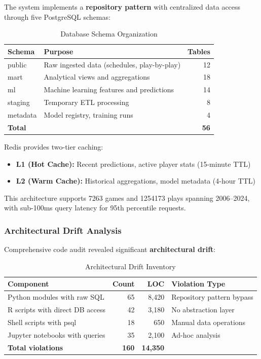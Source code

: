 The system implements a \textbf{repository pattern} with centralized data access through five PostgreSQL schemas:

\begin{table}[htbp]
\centering
\caption{Database Schema Organization}
\label{tab:schema_organization}
\begin{tabular}{@{}lp{6cm}r@{}}
\toprule
\textbf{Schema} & \textbf{Purpose} & \textbf{Tables} \\
\midrule
public & Raw ingested data (schedules, play-by-play) & 12 \\
mart & Analytical views and aggregations & 18 \\
ml & Machine learning features and predictions & 14 \\
staging & Temporary ETL processing & 8 \\
metadata & Model registry, training runs & 4 \\
\midrule
\textbf{Total} & & \textbf{56} \\
\bottomrule
\end{tabular}
\end{table}

Redis provides two-tier caching:
\begin{itemize}
    \item \textbf{L1 (Hot Cache):} Recent predictions, active player stats (15-minute TTL)
    \item \textbf{L2 (Warm Cache):} Historical aggregations, model metadata (4-hour TTL)
\end{itemize}

This architecture supports \SI{7263}{} games and \SI{1254173}{} plays spanning 2006--2024, with sub-100ms query latency for 95th percentile requests.

\subsubsection{Architectural Drift Analysis}

Comprehensive code audit revealed significant \textbf{architectural drift}:

\begin{table}[htbp]
\centering
\caption{Architectural Drift Inventory}
\label{tab:architectural_drift}
\begin{tabular}{@{}lrrp{4cm}@{}}
\toprule
\textbf{Component} & \textbf{Count} & \textbf{LOC} & \textbf{Violation Type} \\
\midrule
Python modules with raw SQL & 65 & 8,420 & Repository pattern bypass \\
R scripts with direct DB access & 42 & 3,180 & No abstraction layer \\
Shell scripts with psql & 18 & 650 & Manual data operations \\
Jupyter notebooks with queries & 35 & 2,100 & Ad-hoc analysis \\
\midrule
\textbf{Total violations} & \textbf{160} & \textbf{14,350} & \\
\bottomrule
\end{tabular}
\end{table}

